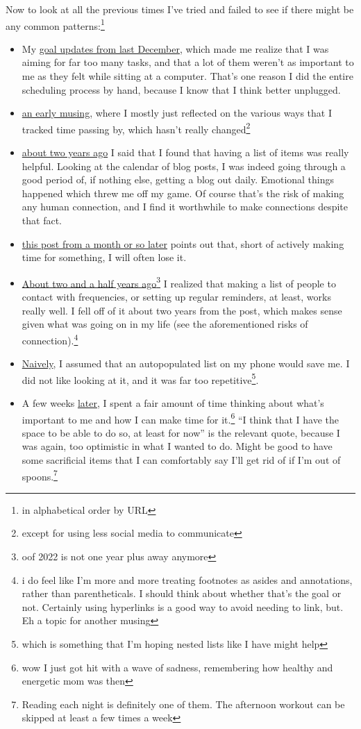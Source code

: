 \documentclass[12pt]{article}[titlepage]
\newcommand{\say}[1]{``#1''}
\renewcommand{\,}{\textsuperscript{,}}
\begin{document}
Now to look at all the previous times I've tried and failed to see if there might be any common patterns:\footnote{in alphabetical order by URL}  
\begin{itemize}  
\item My \href{goal-updates}{goal updates from last December}, which made me realize that I was aiming for far too many tasks, and that a lot of them weren't as important to me as they felt while sitting at a computer. That's one reason I did the entire scheduling process by hand, because I know that I think better unplugged.  
\item \href{how-im-keeping-track-of-my-time-abroad}{an early musing}, where I mostly just reflected on the various ways that I tracked time passing by, which hasn't really changed\footnote{except for using less social media to communicate}  
\item \href{living-scheduled}{about two years ago} I said that I found that having a list of items was really helpful. Looking at the calendar of blog posts, I was indeed going through a good period of, if nothing else, getting a blog out daily. Emotional things happened which threw me off my game.  
Of course that's the risk of making any human connection, and I find it worthwhile to make connections despite that fact.  
\item \href{planning-to-fail}{this post from a month or so later} points out that, short of actively making time for something, I will often lose it.  
\item \href{schedules}{About two and a half years ago}\footnote{oof 2022 is not one year plus away anymore} I realized that making a list of people to contact with frequencies, or setting up regular reminders, at least, works really well.  
I fell off of it about two years from the post, which makes sense given what was going on in my life (see the aforementioned risks of connection).\footnote{i do feel like I'm more and more treating footnotes as asides and annotations, rather than parentheticals. I should think about whether that's the goal or not. Certainly using hyperlinks is a good way to avoid needing to link, but. Eh a topic for another musing}  
\item \href{schedules-2}{Naively}, I assumed that an autopopulated list on my phone would save me. I did not like looking at it, and it was far too repetitive\footnote{which is something that I'm hoping nested lists like I have might help}.  
\item A few weeks \href{schedules-3}{later}, I spent a fair amount of time thinking about what's important to me and how I can make time for it.\footnote{wow I just got hit with a wave of sadness, remembering how healthy and energetic mom was then} \say{I think that I have the space to be able to do so, at least for now} is the relevant quote, because I was again, too optimistic in what I wanted to do. Might be good to have some sacrificial items that I can comfortably say I'll get rid of if I'm out of spoons.\footnote{Reading each night is definitely one of them. The afternoon workout can be skipped at least a few times a week}  

\end{itemize}
\end{document}
